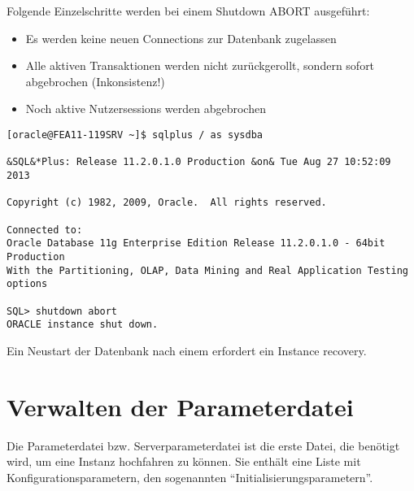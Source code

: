         Folgende Einzelschritte werden bei einem Shutdown ABORT ausgef\"uhrt:
        \begin{itemize}
          \item Es werden keine neuen Connections zur Datenbank zugelassen
          \item Alle aktiven Transaktionen werden nicht zur\"uckgerollt, sondern sofort abgebrochen (Inkonsistenz!)
          \item Noch aktive Nutzersessions werden abgebrochen
        \end{itemize}
        \begin{lstlisting}[caption={Durchf\"uhren eines Shutdown ABORT},label=admin13,language=sqlplus]
[oracle@FEA11-119SRV ~]$ sqlplus / as sysdba

&SQL&*Plus: Release 11.2.0.1.0 Production &on& Tue Aug 27 10:52:09 2013

Copyright (c) 1982, 2009, Oracle.  All rights reserved.

Connected to:
Oracle Database 11g Enterprise Edition Release 11.2.0.1.0 - 64bit Production
With the Partitioning, OLAP, Data Mining and Real Application Testing options

SQL> shutdown abort
ORACLE instance shut down.
        \end{lstlisting}
        \begin{merke}
          Ein Neustart der Datenbank nach einem  erfordert ein Instance recovery.
        \end{merke}
        \begin{literaturinternet}
          \item \cite{i1006091}
        \end{literaturinternet}
    \section{Verwalten der Parameterdatei}
      Die Parameterdatei bzw. Serverparameterdatei ist die erste Datei, die ben\"otigt wird, um eine Instanz hochfahren zu k\"onnen. Sie enth\"alt eine Liste mit Konfigurationsparametern, den sogenannten \enquote{Init\-iali\-sierungs\-pa\-ra\-me\-tern}.

